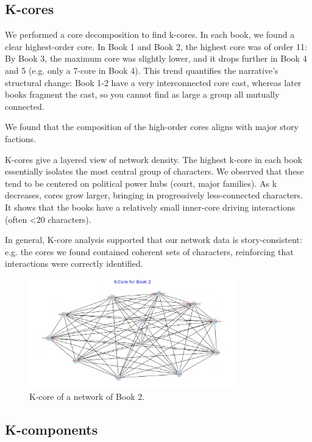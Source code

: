 \documentclass[12pt, a4paper]{article}
\begin{document}
	\subsection*{K-cores}
	
	We performed a core decomposition to find k-cores. 
      In each book, we found a clear highest-order core. 
      In Book 1 and Book 2, the highest core was of order 11: 
      By Book 3, the maximum core was slightly lower, and 
      it drops further in Book 4 and 5 (e.g. only a 7-core in Book 4). 
      This trend quantifies the narrative's structural change: 
      Book 1-2 have a very interconnected core cast, whereas later books fragment 
      the cast, so you cannot find as large a group all mutually connected. 
	
	We found that the composition of the high-order cores aligns with 
      major story factions.
	
	K-cores give a layered view of network density. 
      The highest k-core in each book essentially isolates the most central 
      group of characters. We observed that these tend to be centered 
      on political power hubs (court, major families). As k decreases, 
      cores grow larger, bringing in progressively less-connected characters. 
      It shows that the books have a relatively small inner-core driving interactions 
       (often <20 characters).

	In general, K-core analysis supported that our network data 
      is story-consistent: e.g. the cores we found contained coherent 
      sets of characters, reinforcing that interactions were correctly identified.
	\begin{figure}[htbp]
		\centering
		\includegraphics[width=0.8\textwidth]{k-core-book2.png}
		\caption{K-core of a network of Book 2.}
		\label{fig:kcore}
	\end{figure}
	\FloatBarrier
	\subsection*{K-components}
	
\end{document}
